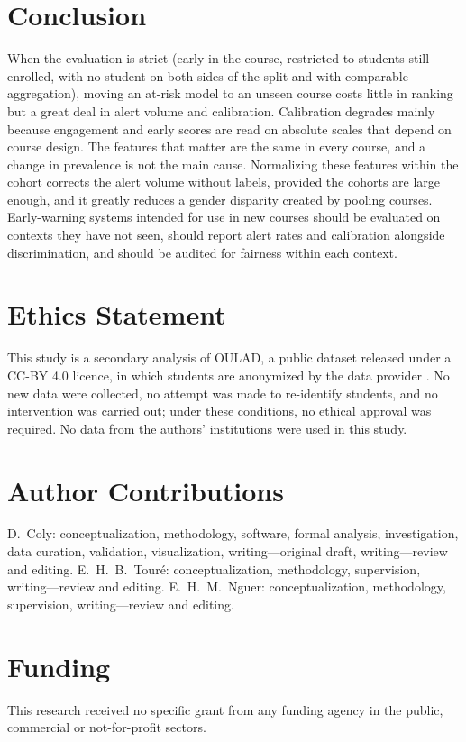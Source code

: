 \documentclass[journal]{IEEEtran}
\begin{document}
\section{Conclusion}
\label{sec:conclusion}
When the evaluation is strict (early in the course, restricted to students still enrolled, with no student on both sides of the split and with comparable aggregation), moving an at-risk model to an unseen course costs little in ranking but a great deal in alert volume and calibration. Calibration degrades mainly because engagement and early scores are read on absolute scales that depend on course design. The features that matter are the same in every course, and a change in prevalence is not the main cause. Normalizing these features within the cohort corrects the alert volume without labels, provided the cohorts are large enough, and it greatly reduces a gender disparity created by pooling courses. Early-warning systems intended for use in new courses should be evaluated on contexts they have not seen, should report alert rates and calibration alongside discrimination, and should be audited for fairness within each context.

\section*{Ethics Statement}
This study is a secondary analysis of OULAD, a public dataset released under a CC-BY 4.0 licence, in which students are anonymized by the data provider \cite{kuzilek2017oulad}. No new data were collected, no attempt was made to re-identify students, and no intervention was carried out; under these conditions, no ethical approval was required. No data from the authors' institutions were used in this study.

\section*{Author Contributions}
D.~Coly: conceptualization, methodology, software, formal analysis, investigation, data curation, validation, visualization, writing---original draft, writing---review and editing. E.~H.~B.~Tour\'e: conceptualization, methodology, supervision, writing---review and editing. E.~H.~M.~Nguer: conceptualization, methodology, supervision, writing---review and editing.

\section*{Funding}
This research received no specific grant from any funding agency in the public, commercial or not-for-profit sectors.
\end{document}
